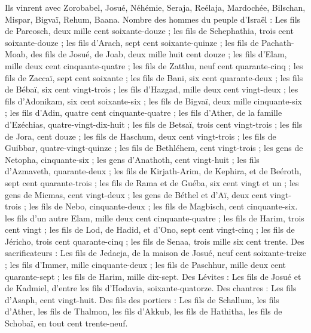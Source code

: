 \begin{multicols}{2}
Ils vinrent avec Zorobabel, Josué, Néhémie, Seraja, Reélaja, Mardochée, Bilschan, Mispar, Bigvaï, Rehum, Baana. Nombre des hommes du peuple d'Israël :
Les fils de Pareosch, deux mille cent soixante-douze ;
les fils de Schephathia, trois cent soixante-douze ;
les fils d'Arach, sept cent soixante-quinze ;
les fils de Pachath-Moab, des fils de Josué, de Joab, deux mille huit cent douze ;
les fils d'Elam, mille deux cent cinquante-quatre ;
les fils de Zatthu, neuf cent quarante-cinq ;
les fils de Zaccaï, sept cent soixante ;
les fils de Bani, six cent quarante-deux ;
les fils de Bébaï, six cent vingt-trois ;
les fils d'Hazgad, mille deux cent vingt-deux ;
les fils d'Adonikam, six cent soixante-six ;
les fils de Bigvaï, deux mille cinquante-six ;
les fils d’Adin, quatre cent cinquante-quatre ;
les fils d'Ather, de la famille d'Ezéchias, quatre-vingt-dix-huit ;
les fils de Betsaï, trois cent vingt-trois ;
les fils de Jora, cent douze ;
les fils de Haschum, deux cent vingt-trois ;
les fils de Guibbar, quatre-vingt-quinze ;
les fils de Bethléhem, cent vingt-trois ;
les gens de Netopha, cinquante-six ;
les gens d'Anathoth, cent vingt-huit ;
les fils d'Azmaveth, quarante-deux ;
les fils de Kirjath-Arim, de Kephira, et de Beéroth, sept cent quarante-trois ;
les fils de Rama et de Guéba, six cent vingt et un ;
les gens de Micmas, cent vingt-deux ;
les gens de Béthel et d’Aï, deux cent vingt-trois ;
les fils de Nebo, cinquante-deux ;
les fils de Magbisch, cent cinquante-six.
les fils d'un autre Elam, mille deux cent cinquante-quatre ;
les fils de Harim, trois cent vingt ;
les fils de Lod, de Hadid, et d'Ono, sept cent vingt-cinq ;
les fils de Jéricho, trois cent quarante-cinq ;
les fils de Senaa, trois mille six cent trente.
Des sacrificateurs : Les fils de Jedaeja, de la maison de Josué, neuf cent soixante-treize ;
les fils d'Immer, mille cinquante-deux ;
les fils de Paschhur, mille deux cent quarante-sept ;
les fils de Harim, mille dix-sept.
Des Lévites : Les fils de Josué et de Kadmiel, d'entre les fils d’Hodavia, soixante-quatorze.
Des chantres : Les fils d'Asaph, cent vingt-huit.
Des fils des portiers : Les fils de Schallum, les fils d'Ather, les fils de Thalmon, les fils d’Akkub, les fils de Hathitha, les fils de Schobaï, en tout cent trente-neuf.

\end{multicols}
